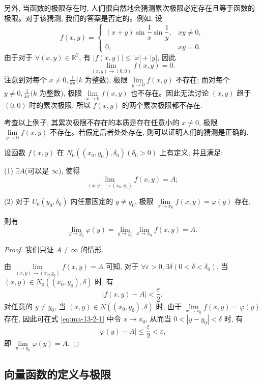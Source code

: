 另外, 当函数的极限存在时, 人们很自然地会猜测累次极限必定存在且等于函数的极限。对于该猜测, 我们的答案是否定的。例如, 设
\[
  f(x,y)=
  \begin{cases}
    (x+y)\sin\dfrac1x\sin\dfrac1y, & xy\ne0,\\
    0, & xy=0.
  \end{cases}
\]
由于对于 $\forall(x,y)\in\mathbb R^2$, 有 $|f(x,y)|\leqslant |x|+|y|$, 因此
\[
  \lim_{(x,y)\to(0,0)}f(x,y)=0.
\]
注意到对每个 $x\ne0,\frac1{k\pi}(k$ 为整数), 极限 $\lim\limits_{y\to0}f(x,y)$ 不存在; 而对每个 $y\ne0,\frac1{k\pi}(k$ 为整数), 极限 $\lim\limits_{x\to0}f(x,y)$ 也不存在。因此无法讨论 $(x,y)$ 趋于 $(0,0)$ 时的累次极限, 所以 $f(x,y)$ 的两个累次极限都不存在.

考查以上例子, 其累次极限不存在的本质是存在任意小的 $x\ne0$, 极限 $\lim\limits_{y\to0}f(x,y)$ 不存在。若假定后者处处存在, 则可以证明人们的猜测是正确的.

\begin{theorem}\label{theorem:ma-13-2-2}
设函数 $f(x,y)$ 在 $N_0((x_0,y_0),\delta_0)(\delta_0>0)$ 上有定义, 并且满足:

(1) $\exists A$(可以是 $\infty$), 使得
\[
  \lim_{(x,y)\to(x_0,y_0)}f(x,y)=A;
\]

(2) 对于 $U_0(y_0,\delta_0)$ 内任意固定的 $y\ne y_0$, 极限 $\lim\limits_{x\to x_0}f(x,y)=\varphi(y)$ 存在,

则有
\[
  \lim_{y\to y_0}\varphi(y)
  =\lim_{y\to y_0}\lim_{x\to x_0}f(x,y)=A.
\]
\end{theorem}


\begin{proof}
我们只证 $A\ne\infty$ 的情形.

由 $\lim\limits_{(x,y)\to(x_0,y_0)}f(x,y)=A$ 可知, 对于 $\forall\varepsilon>0,\exists\delta(0<\delta<\delta_0)$, 当 $(x,y)\in N_0((x_0,y_0),\delta)$ 时, 有
\begin{equation}
  |f(x,y)-A|<\frac{\varepsilon}{2}.
  \label{eq:ma-13-2-1}
\end{equation}
对任意的 $y\ne y_0$, 当 $(x,y)\in N((x_0,y_0),\delta)$ 时, 由于 $\lim\limits_{x\to x_0}f(x,y)=\varphi(y)$ 存在, 因此可在式 \eqref{eq:ma-13-2-1} 中令 $x\to x_0$, 从而当 $0<|y-y_0|<\delta$ 时, 有
\[
  |\varphi(y)-A|\leqslant\frac{\varepsilon}{2}<\varepsilon,
\]
即 $\lim\limits_{y\to y_0}\varphi(y)=A$.
\end{proof}


\subsection{向量函数的定义与极限}
\label{subsec:ma-13-2-4}

